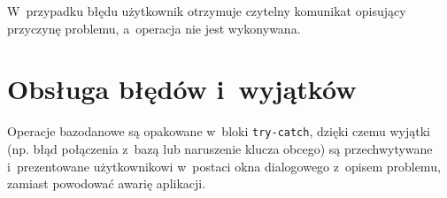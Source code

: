 W~przypadku b\l{}\k{e}du u\.{z}ytkownik otrzymuje czytelny komunikat opisuj\k{a}cy
przyczyn\k{e} problemu, a~operacja nie jest wykonywana.

\section{Obs\l{}uga b\l{}\k{e}d\'{o}w i~wyj\k{a}tk\'{o}w}

Operacje bazodanowe s\k{a} opakowane w~bloki \texttt{try-catch}, dzi\k{e}ki czemu
wyj\k{a}tki (np. b\l{}\k{a}d po\l{}\k{a}czenia z~baz\k{a} lub naruszenie
klucza obcego) s\k{a} przechwytywane i~prezentowane u\.{z}ytkownikowi
w~postaci okna dialogowego z~opisem problemu, zamiast powodowa\'{c}
awari\k{e} aplikacji.